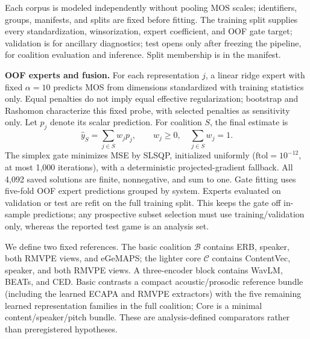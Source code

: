 \documentclass{article}
\newcommand{\core}{\ensuremath{\mathcal{C}}}
\newcommand{\basic}{\ensuremath{\mathcal{B}}}
\begin{document}
Each corpus is modeled independently without pooling MOS scales; identifiers,
groups, manifests, and splits are fixed before fitting. The training split supplies every
standardization, winsorization, expert coefficient, and OOF gate target;
validation is for ancillary diagnostics; test opens only after freezing the
pipeline, for coalition evaluation and inference. Split membership is in the manifest.

\noindent\textbf{OOF experts and fusion.} For each representation $j$, a
linear ridge expert with fixed $\alpha=10$ predicts MOS from dimensions
standardized with training statistics only. Equal penalties do not imply
equal effective regularization; bootstrap and Rashomon characterize this fixed
probe, with selected penalties as sensitivity only. Let $p_j$ denote its scalar prediction. For coalition
$S$, the final estimate is
\begin{equation}
 \hat y_S=\sum_{j\in S}w_jp_j,\qquad
 w_j\geq0,\quad\sum_{j\in S}w_j=1 .
 \label{eq:gate}
\end{equation}
The simplex gate minimizes MSE by SLSQP, initialized uniformly
($\mathrm{ftol}=10^{-12}$, at most 1,000 iterations), with a deterministic
projected-gradient fallback. All 4,092 saved solutions are finite, nonnegative,
and sum to one. Gate fitting uses five-fold OOF expert predictions grouped by
system. Experts evaluated on validation or test are refit on the full training
split. This keeps the gate off in-sample predictions; any prospective subset
selection must use training/validation only, whereas the reported test game is
an analysis set.

We define two fixed references. The basic coalition $\basic$ contains ERB,
speaker, both RMVPE views, and eGeMAPS; the lighter core $\core$ contains
ContentVec, speaker, and both RMVPE views. A three-encoder block contains WavLM,
BEATs, and CED. Basic contrasts a compact acoustic/prosodic reference bundle
(including the learned ECAPA and RMVPE extractors) with the five remaining
learned representation families in the full coalition; Core is a minimal
content/speaker/pitch bundle. These are
analysis-defined comparators rather than preregistered hypotheses.
\end{document}
